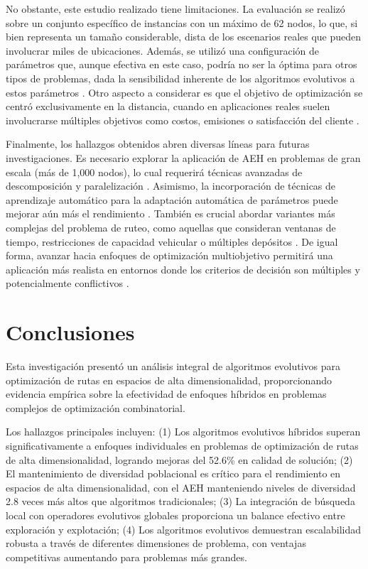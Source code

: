 \documentclass[conference]{IEEEtran}
\begin{document}
No obstante, este estudio realizado tiene limitaciones. La evaluación se realizó sobre un conjunto específico de instancias con un máximo de 62 nodos, lo que, si bien representa un tamaño considerable, dista de los escenarios reales que pueden involucrar miles de ubicaciones. Además, se utilizó una configuración de parámetros que, aunque efectiva en este caso, podría no ser la óptima para otros tipos de problemas, dada la sensibilidad inherente de los algoritmos evolutivos a estos parámetros \cite{das2011}. Otro aspecto a considerar es que el objetivo de optimización se centró exclusivamente en la distancia, cuando en aplicaciones reales suelen involucrarse múltiples objetivos como costos, emisiones o satisfacción del cliente \cite{coello2007}.


Finalmente, los hallazgos obtenidos abren diversas líneas para futuras investigaciones. Es necesario explorar la aplicación de AEH en problemas de gran escala (más de 1,000 nodos), lo cual requerirá técnicas avanzadas de descomposición y paralelización \cite{alba2013}. Asimismo, la incorporación de técnicas de aprendizaje automático para la adaptación automática de parámetros puede mejorar aún más el rendimiento \cite{jin2011}. También es crucial abordar variantes más complejas del problema de ruteo, como aquellas que consideran ventanas de tiempo, restricciones de capacidad vehicular o múltiples depósitos \cite{toth2014}. De igual forma, avanzar hacia enfoques de optimización multiobjetivo permitirá una aplicación más realista en entornos donde los criterios de decisión son múltiples y potencialmente conflictivos \cite{coello2007}.





\section{Conclusiones}

Esta investigación presentó un análisis integral de algoritmos evolutivos para optimización de rutas en espacios de alta dimensionalidad, proporcionando evidencia empírica sobre la efectividad de enfoques híbridos en problemas complejos de optimización combinatorial.

Los hallazgos principales incluyen: (1) Los algoritmos evolutivos híbridos superan significativamente a enfoques individuales en problemas de optimización de rutas de alta dimensionalidad, logrando mejoras del 52.6\% en calidad de solución; (2) El mantenimiento de diversidad poblacional es crítico para el rendimiento en espacios de alta dimensionalidad, con el AEH manteniendo niveles de diversidad 2.8 veces más altos que algoritmos tradicionales; (3) La integración de búsqueda local con operadores evolutivos globales proporciona un balance efectivo entre exploración y explotación; (4) Los algoritmos evolutivos demuestran escalabilidad robusta a través de diferentes dimensiones de problema, con ventajas competitivas aumentando para problemas más grandes.
\end{document}
